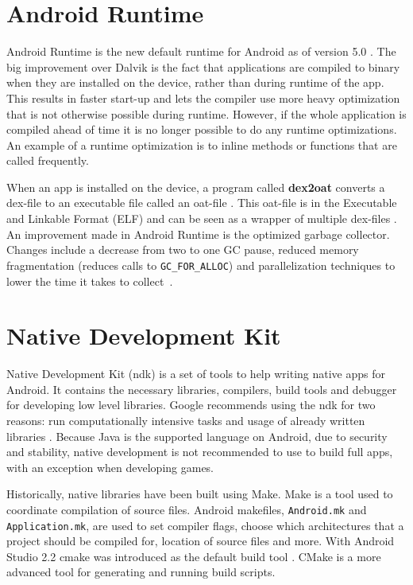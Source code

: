 \section{Android Runtime}
Android Runtime is the new default runtime for Android as of version 5.0 \cite{android:dalvik}. The big improvement over Dalvik is the fact that applications are compiled to binary when they are installed on the device, rather than during runtime of the app. This results in faster start-up \cite{li2016advanced} and lets the compiler use more heavy optimization that is not otherwise possible during runtime. However, if the whole application is compiled ahead of time it is no longer possible to do any runtime optimizations. An example of a runtime optimization is to inline methods or functions that are called frequently.

When an app is installed on the device, a program called \textbf{dex2oat} converts a \gls{dex}-file to an executable file called an oat-file \cite{android:art:dalvik}. This oat-file is in the Executable and Linkable Format (ELF) and can be seen as a wrapper of multiple \gls{dex}-files \cite{Dresel2016}. An improvement made in Android Runtime is the optimized garbage collector. Changes include a decrease from two to one GC pause, reduced memory fragmentation (reduces calls to \texttt{GC\_FOR\_ALLOC}) and parallelization techniques to lower the time it takes to collect~\cite{android:art:dalvik}.


\section{Native Development Kit}
Native Development Kit (\gls{ndk}) is a set of tools to help writing native apps for Android. It contains the necessary libraries, compilers, build tools and debugger for developing low level libraries. Google recommends using the \gls{ndk} for two reasons: run computationally intensive tasks and usage of already written libraries \cite{android:ndk:guides}. Because Java is the supported language on Android, due to security and stability, native development is not recommended to use to build full apps, with an exception when developing games.

Historically, native libraries have been built using Make. Make is a tool used to coordinate compilation of source files. Android makefiles, \texttt{Android.mk} and \texttt{Application.mk}, are used to set compiler flags, choose which architectures that a project should be compiled for, location of source files and more. With Android Studio 2.2 \gls{cmake} was introduced as the default build tool \cite{android:studio:cmake}. CMake is a more advanced tool for generating and running build scripts.

